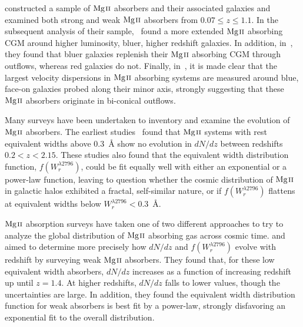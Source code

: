\documentclass[iop,apj,numberedappendix,appendixfloats,twocolappendix]{emulateapj}
\begin{document}
\cite{MAGIICAT1} constructed a sample of ${\hbox{{\rm Mg}\kern 0.1em{\sc ii}}}$ absorbers and their associated galaxies and examined both strong and weak ${\hbox{{\rm Mg}\kern 0.1em{\sc ii}}}$ absorbers from $0.07 \le z \le 1.1$. In the subsequent analysis of their sample,~\cite{MAGIICAT2} found a more extended ${\hbox{{\rm Mg}\kern 0.1em{\sc ii}}}$ absorbing CGM around higher luminosity, bluer, higher redshift galaxies. In addition, in~\cite{MAGIICAT4}, they found that bluer galaxies replenish their ${\hbox{{\rm Mg}\kern 0.1em{\sc ii}}}$ absorbing CGM through outflows, whereas red galaxies do not. Finally, in~\cite{MAGIICAT5}, it is made clear that the largest velocity dispersions in ${\hbox{{\rm Mg}\kern 0.1em{\sc ii}}}$ absorbing systems are measured around blue, face-on galaxies probed along their minor axis, strongly suggesting that these ${\hbox{{\rm Mg}\kern 0.1em{\sc ii}}}$ absorbers originate in bi-conical outflows.

Many surveys have been undertaken to inventory and examine the evolution of ${\hbox{{\rm Mg}\kern 0.1em{\sc ii}}}$ absorbers. The earliest studies~\citep{Lanzetta1987,Tytler1987,Sargent1988,Steidel1992} found that ${\hbox{{\rm Mg}\kern 0.1em{\sc ii}}}$ systems with rest equivalent widths above $0.3$~{\AA} show no evolution in $dN\!/dz$ between redshifts $0.2 < z < 2.15$. These studies also found that the equivalent width distribution function, $f(W_r^{\lambda2796})$, could be fit equally well with either an exponential or a power-law function, leaving to question whether the cosmic distribution of ${\hbox{{\rm Mg}\kern 0.1em{\sc ii}}}$ in galactic halos exhibited a fractal, self-similar nature, or if $f(W_r^{\lambda2796})$ flattens at equivalent widths below $W_r^{\lambda2796} < 0.3$~{\AA}.

${\hbox{{\rm Mg}\kern 0.1em{\sc ii}}}$ absorption surveys have taken one of two different approaches to try to analyze the global distribution of ${\hbox{{\rm Mg}\kern 0.1em{\sc ii}}}$ absorbing gas across cosmic time. \cite{Churchill1999} and \cite{Narayanan2007} aimed to determine more precisely how $dN\!/dz$ and $f(W_r^{\lambda2796})$ evolve with redshift by surveying weak ${\hbox{{\rm Mg}\kern 0.1em{\sc ii}}}$ absorbers. They found that, for these low equivalent width absorbers, $dN\!/dz$ increases as a function of increasing redshift up until $z = 1.4$. At higher redshifts, $dN\!/dz$ falls to lower values, though the uncertainties are large. In addition, they found the equivalent width distribution function for weak absorbers is best fit by a power-law, strongly disfavoring an exponential fit to the overall distribution. 
\end{document}
